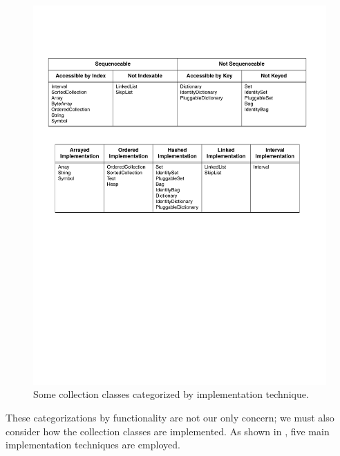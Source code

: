 \documentclass[a4paper,10pt,twoside]{book}
\begin{document}
\begin{figure}
\begin{center}
\includegraphics[width=\textwidth]{CollectionsByImpl}
\caption{Some collection classes categorized by implementation technique.
    \label{fig:collsByImpl}}
\end{center}
\end{figure}

These categorizations by functionality are not our only concern; we must also consider how the collection classes are implemented. As shown in , five main implementation techniques are employed.
\end{document}
